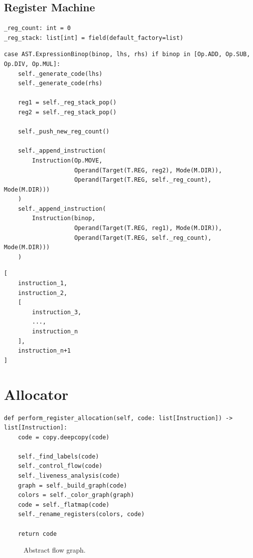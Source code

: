 \newpage


\subsection{Register Machine}
\cite{ModernCompilerImplementation}
\begin{verbatim}
_reg_count: int = 0
_reg_stack: list[int] = field(default_factory=list)
\end{verbatim}

\begin{verbatim}
case AST.ExpressionBinop(binop, lhs, rhs) if binop in [Op.ADD, Op.SUB, Op.DIV, Op.MUL]:
    self._generate_code(lhs)
    self._generate_code(rhs)

    reg1 = self._reg_stack_pop()
    reg2 = self._reg_stack_pop()

    self._push_new_reg_count()

    self._append_instruction(
        Instruction(Op.MOVE,
                    Operand(Target(T.REG, reg2), Mode(M.DIR)),
                    Operand(Target(T.REG, self._reg_count), Mode(M.DIR)))
    )
    self._append_instruction(
        Instruction(binop,
                    Operand(Target(T.REG, reg1), Mode(M.DIR)),
                    Operand(Target(T.REG, self._reg_count), Mode(M.DIR)))
    )
\end{verbatim}

\begin{verbatim}
[
    instruction_1,
    instruction_2,
    [
        instruction_3,
        ..., 
        instruction_n
    ],
    instruction_n+1
]
\end{verbatim}

\newpage

\section{Allocator}

\begin{verbatim}
def perform_register_allocation(self, code: list[Instruction]) -> list[Instruction]:
    code = copy.deepcopy(code)

    self._find_labels(code)
    self._control_flow(code)
    self._liveness_analysis(code)
    graph = self._build_graph(code)
    colors = self._color_graph(graph)
    code = self._flatmap(code)
    self._rename_registers(colors, code)

    return code
\end{verbatim}

\begin{figure}[H]
    \centering
    
    \caption{Abstract flow graph.}
\end{figure}

